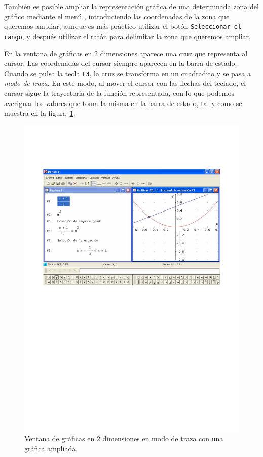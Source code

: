 También es posible ampliar la representación gráfica de una
determinada zona del gráfico mediante el menú
, introduciendo las
coordenadas de la zona que queremos ampliar, aunque es más práctico
utilizar el botón \texttt{Seleccionar el rango}, y después utilizar
el ratón para delimitar la zona que queremos ampliar.

En la ventana de gráficas en 2 dimensiones aparece una cruz que
representa al cursor. Las coordenadas del cursor siempre aparecen en
la barra de estado. Cuando se pulsa la tecla \texttt{F3}, la cruz se
transforma en un cuadradito y se pasa a \emph{modo de traza}. En
este modo, al mover el cursor con las flechas del teclado, el cursor
sigue la trayectoria de la función representada, con lo que podemos
averiguar los valores que toma la misma en la barra de estado, tal y
como se muestra en la figura~\ref{g:modotraza}.

\begin{figure}[h!]
\begin{center}
\includegraphics[scale=0.6]{img/introduccion_derive/modotraza}
\caption{Ventana de gráficas en 2 dimensiones en modo de traza con
una gráfica ampliada.} \label{g:modotraza}
\end{center}
\end{figure}

